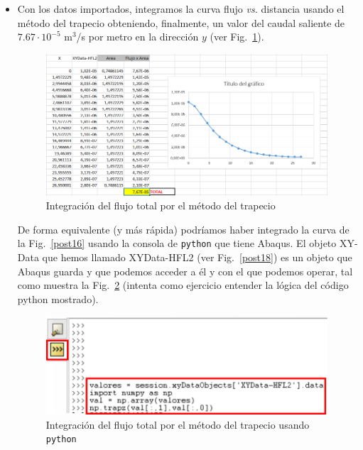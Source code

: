 \begin{itemize}
\item Con los datos importados, integramos la curva flujo \textit{vs.}
  distancia usando el método del trapecio obteniendo, finalmente, un
  valor del caudal saliente de $7.67\cdot 10^{-5}$ m$^3$/s por metro en
  la dirección $y$ (ver Fig.~\ref{post26}).
  \begin{figure}[!h]
    \begin{center}
      \includegraphics[width=0.99\textwidth]{./body/images/post26}
    \end{center}
    \caption{Integración del flujo total por el método del trapecio}
    \label{post26}
  \end{figure}

  De forma equivalente (y más rápida) podríamos haber integrado la
  curva de la Fig.~\ref{post16} usando la consola de \texttt{python}
  que tiene Abaqus. El objeto XY-Data que hemos llamado XYData-HFL2
  (ver Fig.~\ref{post18}) es un objeto que Abaqus guarda y que podemos
  acceder a él y con el que podemos operar, tal como muestra la
  Fig.~\ref{post26b} (intenta como ejercicio entender la lógica del
  código python mostrado).
  \begin{figure}[!h]
    \begin{center}
      \includegraphics[width=0.99\textwidth]{./body/images/post26b.pdf}
    \end{center}
    \caption{Integración del flujo total por el método del trapecio
      usando \texttt{python}}
    \label{post26b}
  \end{figure}


\end{itemize}
